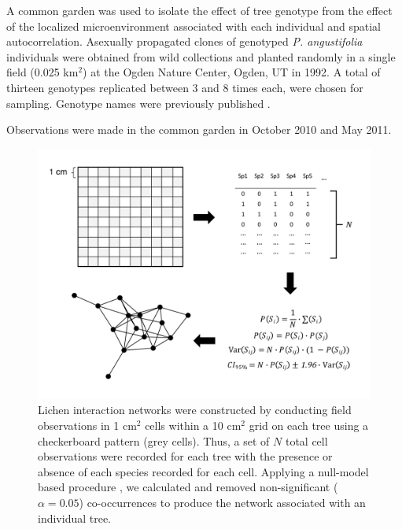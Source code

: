 \documentclass[9pt,twocolumn,twoside,lineno]{pnas-new}
\begin{document}
{A common garden was used to isolate the effect of tree genotype from
the effect of the localized microenvironment associated with each
individual and spatial autocorrelation. Asexually propagated clones of
genotyped \textit{P. angustifolia} individuals were obtained from wild
collections and planted randomly in a single field (0.025 km$^2$) at
the Ogden Nature Center, Ogden, UT in 1992. A total of thirteen
genotypes replicated between 3 and 8 times each, were chosen for
sampling. Genotype names were previously published
\cite{Martinsen}. 

Observations were made in the common garden in October 2010 and May
2011. 





\begin{figure}[ht]
\centering
\includegraphics[width=\linewidth]{conet_method.pdf}
\caption{Lichen interaction networks were constructed by conducting
  field observations in 1 cm$^2$ cells within a 10 cm$^2$ grid on each
  tree using a checkerboard pattern (grey cells). Thus, a set of $N$
  total cell observations were recorded for each tree with the
  presence or absence of each species recorded for each cell. Applying
  a null-model based procedure \cite{Araujo2011}, we calculated and
  removed non-significant ($\alpha = 0.05$) co-occurrences to produce
  the network associated with an individual tree.}
\label{fig:conet_method}
\end{figure}


}
\end{document}

